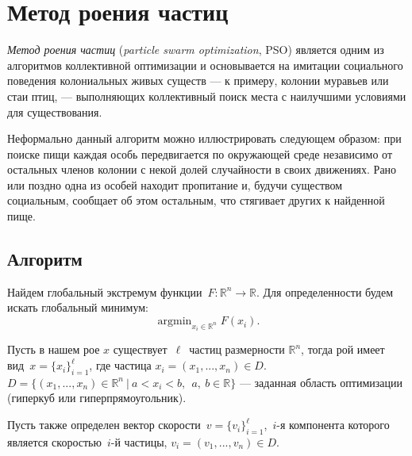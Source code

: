 \chapter{Метод роения частиц} \label{ParticleSwarmOptimisation}
\noindent
\emph{Метод роения частиц} (\emph{particle swarm optimization}, PSO) является одним из алгоритмов коллективной оптимизации и основывается на имитации социального поведения колониальных живых существ --- к примеру, колонии муравьев или стаи птиц, --- выполняющих коллективный поиск места с наилучшими условиями для существования.

Неформально данный алгоритм можно иллюстрировать следующем образом: при поиске пищи каждая особь передвигается по окружающей среде независимо от остальных членов колонии с некой долей случайности в своих движениях. Рано или поздно одна из особей находит пропитание и, будучи существом социальным, сообщает об этом остальным, что стягивает других к найденной пище.

\section{Алгоритм}
\noindent
Найдем глобальный экстремум функции~$F \colon \mathbb{R}^{n} \to \mathbb{R}$. Для определенности будем искать глобальный минимум:
\[
	\mathop{\mathrm{argmin}}_{x_i \in \mathbb{R}^{n}} F(x_i).
\]

Пусть в нашем рое $x$ существует~$\ell$~частиц размерности $\mathbb{R}^{n}$, тогда рой имеет вид~$x = \{x_i\}_{i = 1}^{\ell}$, где частица $x_i = (x_1, ..., x_n) \in D$.
$D = \{(x_1, ..., x_n) \in \mathbb{R}^n \ | \  a < x_i < b,\ \ a,\ b \in \mathbb{R} \}$ --- заданная область оптимизации (гиперкуб или гиперпрямоугольник).

Пусть также определен вектор скорости~$v = \{v_i\}_{i=1}^{\ell}$,~$i$-я компонента которого является скоростью~$i$-й частицы, $v_i = (v_1, ..., v_n) \in D$.

